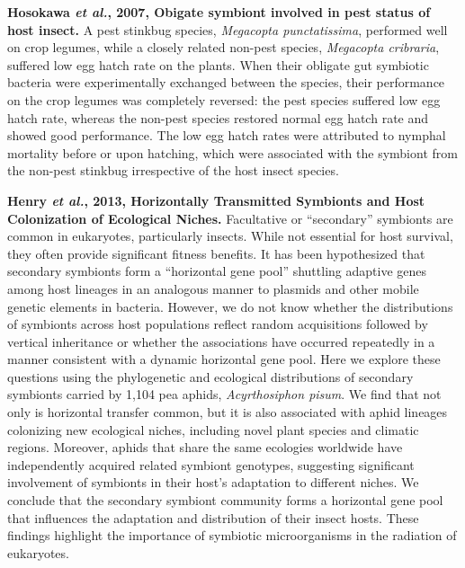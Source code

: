 \documentclass[11pt]{article}
\begin{document}
\begin{sloppypar}
\textbf{Hosokawa \textit{et al.}, 2007, Obigate symbiont involved in pest status of host insect.} \newline
A pest stinkbug species, \textit{Megacopta punctatissima}, performed well on crop legumes, while a closely related non-pest species, \textit{Megacopta cribraria}, suffered low egg hatch rate on the plants. 
When their obligate gut symbiotic bacteria were experimentally exchanged between the species, their performance on the crop legumes was completely reversed: 
the pest species suffered low egg hatch rate, whereas the non-pest species restored normal egg hatch rate and showed good performance. 
The low egg hatch rates were attributed to nymphal mortality before or upon hatching, which were associated with the symbiont from the non-pest stinkbug irrespective of the host insect species.

\par

\textbf{Henry \textit{et al.}, 2013, Horizontally Transmitted Symbionts and Host Colonization of Ecological Niches.} \newline
Facultative or “secondary” symbionts are common in eukaryotes, particularly insects. 
While not essential for host survival, they often provide significant fitness benefits. 
It has been hypothesized that secondary symbionts form a “horizontal gene pool” shuttling adaptive genes among host lineages in an analogous manner to plasmids and other mobile genetic elements in bacteria. 
However, we do not know whether the distributions of symbionts across host populations reflect 
random acquisitions followed by vertical inheritance or whether 
the associations have occurred repeatedly in a manner consistent with a dynamic horizontal gene pool. 
Here we explore these questions using the phylogenetic and ecological distributions of secondary symbionts carried by 1,104 pea aphids, \textit{Acyrthosiphon pisum}. 
We find that not only is horizontal transfer common, but it is also associated with aphid lineages colonizing new ecological niches, including novel plant species and climatic regions. 
Moreover, aphids that share the same ecologies worldwide have independently acquired related symbiont genotypes, suggesting significant involvement of symbionts in their host’s adaptation to different niches. 
We conclude that the secondary symbiont community forms a horizontal gene pool that influences the adaptation and distribution of their insect hosts. 
These findings highlight the importance of symbiotic microorganisms in the radiation of eukaryotes.


\end{sloppypar}
\end{document}
